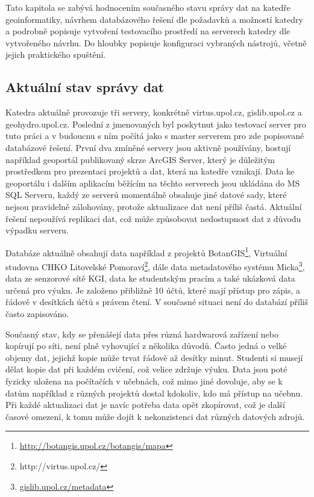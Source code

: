 Tato kapitola se zabývá hodnocením současného stavu správy dat na katedře geoinformatiky, návrhem databázového řešení dle požadavků a možností katedry a podrobně popisuje vytvoření testovacího prostředí na serverech katedry dle vytvořeného návrhu. Do hloubky popisuje konfiguraci vybraných nástrojů, včetně jejich praktického spuštění. 

\subsection{Aktuální stav správy dat}
\label{kAktualniStav}

Katedra aktuálně provozuje tři servery, konkrétně virtus.upol.cz, gislib.upol.cz a geohydro.upol.cz. Poslední z jmenovaných byl poskytnut jako testovací server pro tuto práci a v budoucnu s ním počítá jako s master serverem pro zde popisované databázové řešení. První dva zmíněné servery jsou aktivně používány, hostují například geoportál publikovaný skrze ArcGIS Server, který je důležitým prostředkem pro prezentaci projektů a dat, která na katedře vznikají. Data ke geoportálu i dalším aplikacím běžícím na těchto serverech jsou ukládána do MS SQL Serveru, každý ze serverů momentálně obsahuje jiné datové sady, které nejsou pravidelně zálohovány, protože aktualizace dat není příliš častá. Aktuální řešení nepoužívá replikaci dat, což může způsobovat nedostupnost dat z důvodu výpadku serveru. 

Databáze aktuálně obsahují data například z projektů BotanGIS\footnote{\url{http://botangis.upol.cz/botangis/mapa}}, Virtuální studovna CHKO Litovelské Pomoraví\footnote{http://virtus.upol.cz/}, dále data metadatového systému Micka\footnote{\url{gislib.upol.cz/metadata}}, data ze senzorové sítě KGI, data ke studentským pracím a také ukázková data určená pro výuku. Je založeno přibližně 10 účtů, které mají přístup pro zápis, a řádově v desítkách účtů s právem čtení. V současné situaci není do databází příliš často zapisováno. 

Současný stav, kdy se přenášejí data přes různá hardwarová zařízení nebo kopírují po síti, není plně vyhovující z několika důvodů. Často jedná o velké objemy dat, jejichž kopie může trvat řádově až desítky minut. Studenti si musejí dělat kopie dat při každém cvičení, což velice zdržuje výuku. Data jsou poté fyzicky uložena na počítačích v učebnách, což mimo jiné dovoluje, aby se k datům například z různých projektů dostal kdokoliv, kdo má přístup na učebnu. Při každé aktualizaci dat je navíc potřeba data opět zkopírovat, což je další časové omezení, k tomu může dojít k nekonzistenci dat různých datových zdrojů. 

